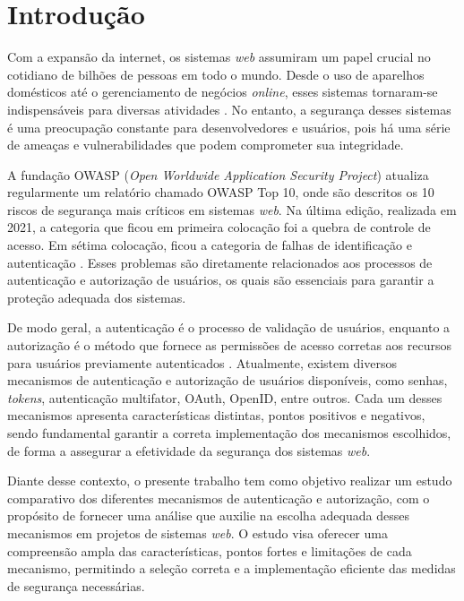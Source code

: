 \section{Introdução}

Com a expansão da internet, os sistemas \emph{web} assumiram um papel crucial no cotidiano de bilhões de
pessoas em todo o mundo. Desde o uso de aparelhos domésticos até o gerenciamento de 
negócios \emph{online}, esses sistemas tornaram-se indispensáveis para diversas atividades 
\cite{GREENGARD2015}. No entanto, a segurança desses sistemas é uma preocupação constante para 
desenvolvedores e usuários, pois há uma série de ameaças e vulnerabilidades que podem comprometer 
sua integridade.

A fundação OWASP (\emph{Open Worldwide Application Security Project}) atualiza regularmente um
relatório chamado OWASP Top 10, onde são descritos os 10 riscos de segurança mais críticos em
sistemas \emph{web}. Na última edição, realizada em 2021, a categoria que ficou em primeira colocação foi
a quebra de controle de acesso. Em sétima colocação, ficou a categoria de falhas de identificação e
autenticação \cite{OWASP2021}. Esses problemas são diretamente relacionados aos processos de
autenticação e autorização de usuários, os quais são essenciais para garantir a proteção adequada
dos sistemas.

De modo geral, a autenticação é o processo de validação de usuários, enquanto a autorização é o
método que fornece as permissões de acesso corretas aos recursos para usuários previamente
autenticados \cite{TUMIN2012}. Atualmente, existem diversos mecanismos de autenticação e autorização
de usuários disponíveis, como senhas, \emph{tokens}, autenticação multifator, OAuth, OpenID, entre
outros. Cada um desses mecanismos apresenta características distintas, pontos positivos e negativos,
sendo fundamental garantir a correta implementação dos mecanismos escolhidos, de forma a assegurar
a efetividade da segurança dos sistemas \emph{web}.

Diante desse contexto, o presente trabalho tem como objetivo realizar um estudo
comparativo dos diferentes mecanismos de autenticação e autorização, com o propósito
de fornecer uma análise que auxilie na escolha adequada desses mecanismos
em projetos de sistemas \emph{web}. O estudo visa oferecer uma compreensão ampla das
características, pontos fortes e limitações de cada mecanismo, permitindo a seleção
correta e a implementação eficiente das medidas de segurança necessárias.
